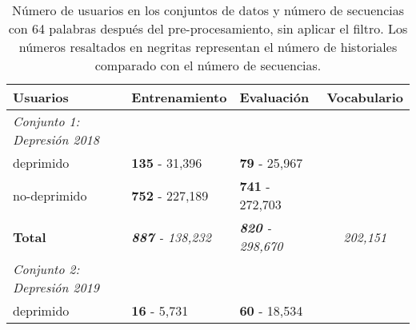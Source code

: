 \begin{table}[!hbt]
\caption{Número de usuarios en los conjuntos de datos y número de secuencias con 64 palabras después del pre-procesamiento, sin aplicar el filtro. Los números resaltados en negritas representan el número de historiales comparado con el número de secuencias.} \label{table:original_users}

\begin{center}

\begin{tabular}{llll}
\hline
\rowcolor[HTML]{FFFFFF} 
\textbf{Usuarios}                                           & \textbf{Entrenamiento}                       & \textbf{Evaluación}                          & \textbf{Vocabulario}                                         \\ \hline
\rowcolor[HTML]{EFEFEF} 
\textit{Conjunto 1: Depresión 2018}                         & \multicolumn{1}{c}{\cellcolor[HTML]{EFEFEF}} & \multicolumn{1}{c}{\cellcolor[HTML]{EFEFEF}} &                                                              \\ \hline
\rowcolor[HTML]{FFFFFF} 
deprimido                                                   & \textbf{135} - 31,396                                 & \textbf{79} - 25,967                                  &                                                              \\ \hline
\rowcolor[HTML]{FFFFFF} 
no-deprimido                                                & \textbf{752} - 227,189                                & \textbf{741} - 272,703                                &                                                              \\ \hline
\rowcolor[HTML]{FFFFFF} 
\textbf{Total}                                              & \textit{\textbf{887} - 138,232}                       & \textit{\textbf{820} - 298,670}                       & \multicolumn{1}{c}{\cellcolor[HTML]{FFFFFF}\textit{202,151}} \\ \hline
\rowcolor[HTML]{EFEFEF} 
\cellcolor[HTML]{EFEFEF}\textit{Conjunto 2: Depresión 2019} &                                              &                                              &                                                              \\ \hline
\rowcolor[HTML]{FFFFFF} 
deprimido                                                   & \textbf{16} - 5,731                                   & \textbf{60} - 18,534                                  &                                                              \\ \hline

\end{tabular}
\end{center}
\end{table}
